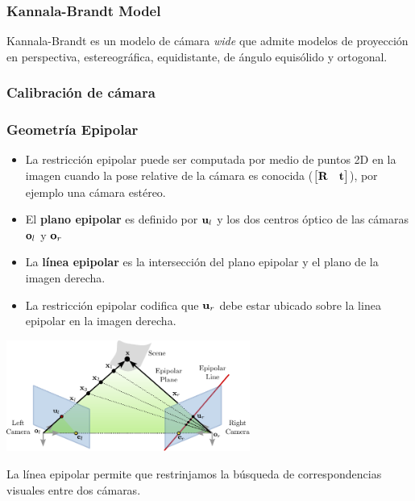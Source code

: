 \begin{frame}
    \frametitle{Kannala-Brandt Model}
    Kannala-Brandt es un modelo de cámara \emph{wide} que admite modelos de proyección en perspectiva, estereográfica, equidistante, de ángulo equisólido y ortogonal.


\end{frame}

\begin{frame}
    \frametitle{Calibración de cámara}
    \footnotesize
    

    
\end{frame}


\begin{frame}
    \frametitle{Geometría Epipolar}
    \footnotesize
    \begin{itemize}
        \item La restricción epipolar puede ser computada por medio de puntos 2D en la imagen cuando la pose relative de la cámara es conocida 
        ($\begin{bmatrix}
        \boldsymbol{\mathbf{R}} & \boldsymbol{\mathbf{t}}
        \end{bmatrix}$), por ejemplo una cámara estéreo.
        \item El \textbf{plano epipolar} es definido por $\boldsymbol{\mathbf{u}}_{l}$ y los dos centros óptico de las cámaras $\boldsymbol{\mathbf{o}}_{l}$ y $\boldsymbol{\mathbf{o}}_{r}$
        \item La \textbf{línea epipolar} es la intersección del plano epipolar y el plano de la imagen derecha.
        \item La restricción epipolar codifica que $\boldsymbol{\mathbf{u}}_{r}$ debe estar ubicado sobre la linea epipolar en la imagen derecha.
    \end{itemize}

    \begin{center}
        \includegraphics[width=0.6\textwidth]{./images/epipolar_geometry_epipolar_line.pdf}
    \end{center}

    La línea epipolar permite que restrinjamos la búsqueda de correspondencias visuales entre dos cámaras.

\end{frame}

